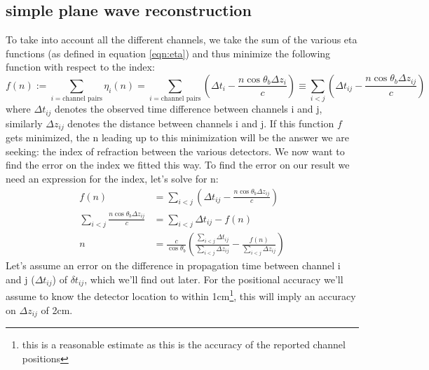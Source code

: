 \subsection{simple plane wave reconstruction}
\label{seq:SimplePW}
To take into account all the different channels, we take the sum of the
various eta functions (as defined in equation \ref{eqn:eta}) and
thus minimize the following function with respect to the index:
\begin{equation}
	f(n) := \sum_{i=\text{channel pairs}}\eta_i(n) = \sum_{i=\text{channel pairs}}\left( \Delta t_i - \frac{n\cos\theta_b \Delta z_i}{c}\right) \equiv \sum_{i<j}\left( \Delta t_{ij} - \frac{n\cos\theta_b \Delta z_{ij}}{c}\right)
  	\label{eqn:PlaneWave}
\end{equation}
where $\Delta t_{ij}$ denotes the observed time difference between
channels i and j, similarly $\Delta z_{ij}$ denotes the distance
between channels i and j.
If this function $f$ gets minimized, the n leading up to this minimization
will be the answer we are seeking: the index of refraction between
the various detectors.  
We now want to find the error on the index we fitted this way. To find the error on our result we need an expression for the index, let's solve for n:
\begin{align}
	f(n) &= \sum_{i<j}\left( \Delta t_{ij} - \frac{n\cos\theta_b \Delta z_{ij}}{c}\right)\\
\sum_{i<j}\frac{n\cos\theta_b \Delta z_{ij}}{c}&=\sum_{i<j}\Delta t_{ij} - f(n)\\
	n &= \frac{c}{\cos\theta_b}\left(\frac{\sum_{i<j}\Delta t_{ij}}{\sum_{i<j} \Delta z_{ij}} - \frac{f(n)}{\sum_{i<j} \Delta z_{ij}}\right)
\end{align}
Let's assume an error on the difference in propagation time between channel i and j
($\Delta t_{ij}$) of $\delta t_{ij}$, which we'll find out later.  For the
positional accuracy we'll assume to know the detector location to within 1cm\footnote{this
is a reasonable estimate as this is the accuracy of the reported channel positions},
this will imply an accuracy on $\Delta z_{ij}$ of 2cm.

